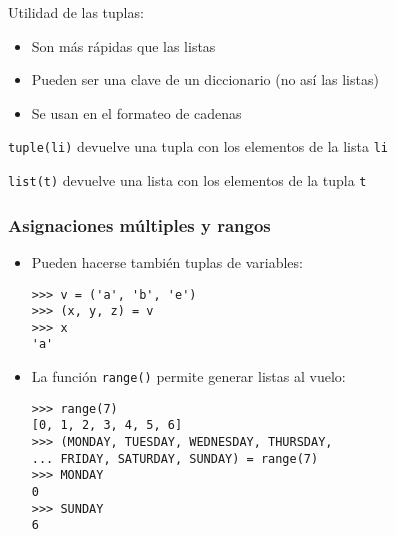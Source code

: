 \documentclass[ucs]{beamer}
\begin{document}

\begin{frame}[fragile]

Utilidad de las tuplas:
\begin{itemize}
\item Son más rápidas que las listas
\item Pueden ser una clave de un diccionario (no así las listas)
\item Se usan en el formateo de cadenas
\end{itemize} 

\verb|tuple(li)| devuelve una tupla con los elementos de la lista \verb|li|

\verb|list(t)| devuelve una lista con los elementos de la tupla \verb|t|

\end{frame} 



\begin{frame}[fragile]
\frametitle{Asignaciones múltiples y rangos}

\begin{itemize}
\item Pueden hacerse también tuplas de variables:
\begin{scriptsize}
\begin{verbatim}
>>> v = ('a', 'b', 'e')
>>> (x, y, z) = v 
>>> x
'a'
\end{verbatim}
\end{scriptsize}

\item La función \verb|range()| permite generar listas al vuelo:
\begin{scriptsize}
\begin{verbatim}
>>> range(7)
[0, 1, 2, 3, 4, 5, 6]
>>> (MONDAY, TUESDAY, WEDNESDAY, THURSDAY, 
... FRIDAY, SATURDAY, SUNDAY) = range(7)
>>> MONDAY
0
>>> SUNDAY
6
\end{verbatim}
\end{scriptsize}
\end{itemize}

\end{frame}



\end{document}
